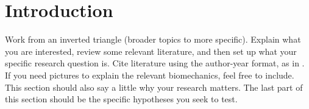 \section{Introduction}

Work from an inverted triangle (broader topics to more specific). Explain what you are interested, review some relevant literature, and then set up what your specific research question is. Cite literature using the author-year format, as in \citep{buck2020go}. If you need pictures to explain the relevant biomechanics, feel free to include. This section should also say a little why your research matters. 
The last part of this section should be the specific hypotheses you seek to test. 

